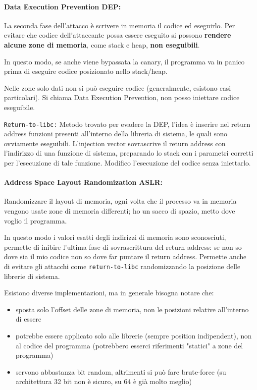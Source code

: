 \paragraph{Data Execution Prevention DEP:} La seconda fase dell'attacco è scrivere in memoria il codice ed eseguirlo. Per evitare che codice dell'attaccante possa essere eseguito si possono \textbf{rendere alcune zone di memoria}, come stack e heap, \textbf{non eseguibili}. 

In questo modo, se anche viene bypassata la canary, il programma va in panico prima di eseguire codice posizionato nello stack/heap. 

Nelle zone solo dati non si può eseguire codice (generalmente, esistono casi particolari). Si chiama Data Execution Prevention, non posso iniettare codice eseguibile.

\texttt{Return-to-libc:} Metodo trovato per evadere la DEP, l'idea è inserire nel return address funzioni presenti all'interno della libreria di sistema, le quali sono ovviamente eseguibili. L'injection vector sovrascrive il return address con l'indirizzo di una funzione di sistema, preparando lo stack con i parametri corretti per l'esecuzione di tale funzione. Modifico l'esecuzione del codice senza iniettarlo.

\paragraph{Address Space Layout Randomization ASLR:} Randomizzare il layout di memoria, ogni volta che il processo va in memoria vengono usate zone di memoria differenti; ho un sacco di spazio, metto dove voglio il programma. 

In questo modo i valori esatti degli indirizzi di memoria sono sconosciuti, permette di inibire l'ultima fase di sovrascrittura del return address: se non so dove sia il mio codice non so dove far puntare il return address. Permette anche di evitare gli attacchi come \texttt{return-to-libc} randomizzando la posizione delle librerie di sistema.

Esistono diverse implementazioni, ma in generale bisogna notare che:
\begin{itemize}
	\item sposta solo l'offset delle zone di memoria, non le posizioni relative all'interno di essere

	\item potrebbe essere applicato solo alle librerie (sempre position indipendent), non al codice del programma (potrebbero esserci riferimenti "statici" a zone del programma)

	\item servono abbastanza bit random, altrimenti si può fare brute-force (su architettura 32 bit non è sicuro, su 64 è già molto meglio)
\end{itemize}

